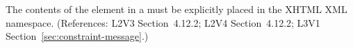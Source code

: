 The contents of the  element in a \Constraint must be
explicitly placed in the XHTML XML namespace.  (References: L2V3
Section~4.12.2; L2V4 Section~4.12.2; L3V1 Section~\ref{sec:constraint-message}.)
